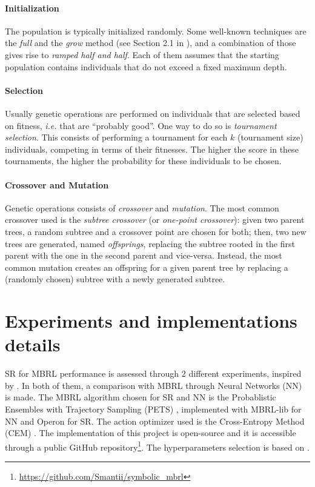 \documentclass[11pt]{article}
\begin{document}
\paragraph{Initialization} The population is typically initialized randomly. Some well-known techniques are the \textsl{full} and the \textsl{grow} method (see Section 2.1 in \cite{o2009riccardo}), and a combination of those gives rise to \textsl{ramped half and half}. Each of them assumes that the starting population contains individuals that do not exceed a fixed maximum depth.

\paragraph{Selection} Usually genetic operations are performed on individuals that are selected based on fitness, \textsl{i.e.} that are ``probably good''. One way to do so is \textsl{tournament selection}. This consists of performing a tournament for each $k$ (tournament size) individuals, competing in terms of their fitnesses. The higher the score in these tournaments, the higher the probability for these individuals to be chosen.

\paragraph{Crossover and Mutation} Genetic operations consists of \textsl{crossover} and \textsl{mutation}. The most common crossover used is the \textsl{subtree crossover} (or \textsl{one-point crossover}): given two parent trees, a random subtree and a crossover point are chosen for both; then, two new trees are generated, named \textsl{offsprings}, replacing the subtree rooted in the first parent with the one in the second parent and vice-versa.
Instead, the most common mutation creates an offspring for a given parent tree by replacing a (randomly chosen) subtree with a newly generated subtree. 

\section{Experiments and implementations details}
SR for MBRL performance is assessed through 2 different experiments, inspired by \cite{kamienny2022symbolic}. In both of them, a comparison with MBRL through Neural Networks (NN) is made. The MBRL algorithm chosen for SR and NN is the Probablistic Ensembles with Trajectory Sampling (PETS) \cite{chua2018deep}, implemented with MBRL-lib \cite{pineda2021mbrl} for NN and Operon \cite{burlacu2020operon} for SR. The action optimizer used is the Cross-Entropy Method (CEM) \cite{de2005tutorial}.
The implementation of this project is open-source and it is accessible through a public GitHub repository\footnote{\href{https://github.com/Smantii/symbolic\_mbrl}{https://github.com/Smantii/symbolic\_mbrl}}.
The hyperparameters selection is based on \cite{kamienny2022symbolic}.
\end{document}
